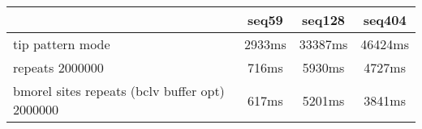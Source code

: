 \begin{tabular}{|l|c|c|c|}
\hline
 & seq59 & seq128 & seq404  \\
\hline
tip pattern mode &  2933ms &  33387ms &  46424ms\\
\hline
repeats 2000000 &  716ms &  5930ms &  4727ms\\
\hline
bmorel sites repeats (bclv buffer opt) 2000000 &  617ms &  5201ms &  3841ms\\
\hline
\end{tabular}
